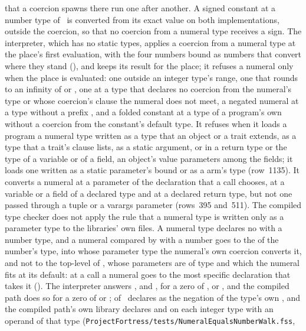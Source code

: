 \begin{description}
that a coercion spawns there run one after another.
A signed constant at a number type of \library\ is converted from its exact
value on both implementations, outside the coercion, so that no coercion from a
numeral type receives a sign.
The interpreter, which has no static types, applies a coercion from a numeral
type at the place's first evaluation, with the four numbers bound as numbers
that convert where they stand (), and keeps its
result for the place; it refuses a numeral
only when the place is evaluated: one outside an integer type's range, one
that rounds to an infinity of  or , one at a
type that declares no coercion from the numeral's type or whose coercion's
 clause the numeral does not meet, a negated numeral at a type
without a prefix \EXP{-}, and a folded constant at a type of a program's own
without a coercion from the constant's default type.
It refuses when it loads a program a numeral type written as a type that an
object or a trait extends, as a type that a trait's  clause
lists, as a static argument, or in a return type or the type of a variable or
of a field, an object's value parameters among the fields; it loads one
written as a static parameter's bound or as a  arm's type
(row~1135).
It converts a
numeral at a parameter of the declaration that a call chooses, at a variable or
a field of a declared type and at a declared return type, but not one passed
through a tuple or a varargs parameter (rows~395 and~511).
The compiled type checker does not apply the rule that a numeral type is written
only as a parameter type to the libraries' own files.
A numeral type declares no \EXP{=} with a number type, and a numeral compared by
\EXP{=} with a number goes to the \EXP{=} of the number's type, into whose
parameter type the numeral's own coercion converts it, and not to the top-level
\EXP{=} of \library, whose parameters are of type  and which the
numeral fits at its default: at a call a numeral goes to the most specific
declaration that takes it ().
The interpreter answers  , and 
, for a zero  of ,  or
, and the compiled path does so for a zero of
 or ;  of \library\ declares
\EXP{\neq} as the negation of the type's own \EXP{=}, and the compiled path's
own library declares \EXP{=} and \EXP{\neq} on each integer type with an
operand of that type (\nolinkurl{ProjectFortress/tests/NumeralEqualsNumberWalk.fss},

\end{description}
